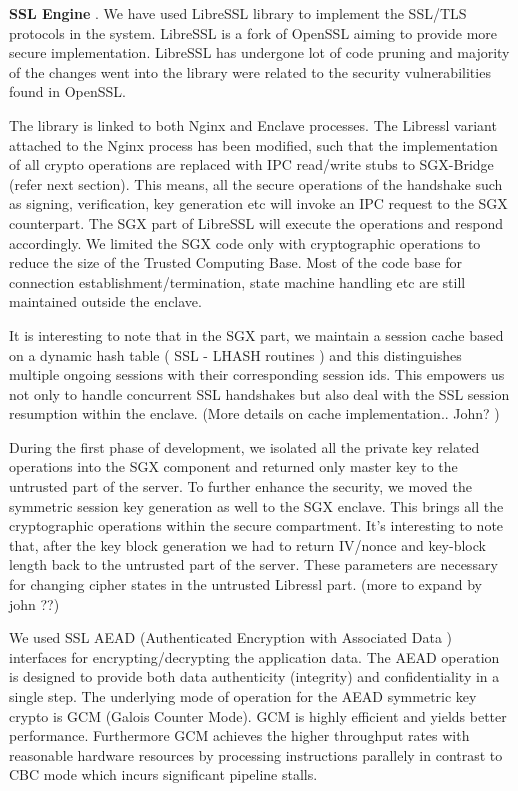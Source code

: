 \documentclass[../main.tex]{subfiles}
\begin{document}
\textbf{SSL Engine }.
We have used LibreSSL library to implement the SSL/TLS protocols in the system. LibreSSL is a fork of OpenSSL aiming to provide more secure implementation. LibreSSL has undergone lot of code pruning and majority of the changes went into the library were related to the security vulnerabilities found in OpenSSL. 

The library is linked to both Nginx and Enclave processes. The Libressl variant attached to the Nginx process has been modified, such that  the implementation of all crypto operations are replaced with IPC read/write stubs to SGX-Bridge (refer next section).  This means,  all the secure operations of the handshake such as signing, verification, key generation etc will invoke an IPC request to the SGX counterpart. The SGX part of LibreSSL will  execute the operations and respond accordingly. We limited the SGX  code only with cryptographic operations to reduce the size of the Trusted Computing Base. Most of the code base for connection establishment/termination, state machine handling etc are still maintained outside the enclave. 

It is interesting to note that in the SGX part, we maintain a session cache based on a dynamic hash table ( SSL - LHASH routines ) and this distinguishes multiple ongoing sessions with their corresponding session ids. This empowers us not only to handle concurrent SSL handshakes but also deal with the SSL session resumption within the enclave. 
 (More details on cache implementation.. John? )


During the first phase of development, we isolated all the private key related operations into the SGX component and returned only master key to the untrusted part of the server. To further enhance the security, we moved the symmetric session key generation as well to the SGX enclave.  This brings all the cryptographic operations within the secure compartment. It’s interesting to note that, after the key block generation we had to return IV/nonce and key-block length back to the untrusted part of the server. These parameters are necessary for changing cipher states in the untrusted Libressl part.  (more to expand by john ??)

We used SSL AEAD (Authenticated Encryption with Associated Data ) interfaces for encrypting/decrypting the application data. The AEAD operation is designed to provide both data authenticity (integrity) and confidentiality in a single step. The  underlying mode of operation for the AEAD symmetric key crypto is GCM (Galois Counter Mode). GCM is highly efficient and yields better performance. Furthermore GCM achieves the higher throughput rates with reasonable hardware resources by processing instructions parallely in contrast to CBC mode which incurs significant pipeline stalls.
\end{document}
